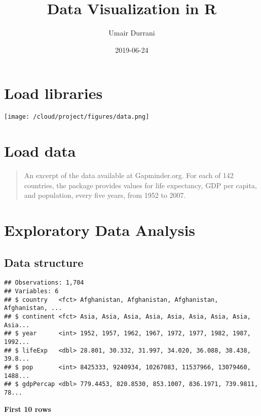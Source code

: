 \documentclass[]{article}
\title{Data Visualization in R}
\author{Umair Durrani}
\date{2019-06-24}
\begin{document}
\maketitle

{
\setcounter{tocdepth}{2}
\tableofcontents
}
\hypertarget{load-libraries}{%
\section{Load libraries}\label{load-libraries}}

\texttt{[image: /cloud/project/figures/data.png]}

\hypertarget{load-data}{%
\section{Load data}\label{load-data}}

\begin{quote}
An excerpt of the data available at Gapminder.org. For each of 142
countries, the package provides values for life expectancy, GDP per
capita, and population, every five years, from 1952 to 2007.
\end{quote}

\hypertarget{exploratory-data-analysis}{%
\section{Exploratory Data Analysis}\label{exploratory-data-analysis}}

\hypertarget{data-structure}{%
\subsection{Data structure}\label{data-structure}}

\begin{verbatim}
## Observations: 1,704
## Variables: 6
## $ country   <fct> Afghanistan, Afghanistan, Afghanistan, Afghanistan, ...
## $ continent <fct> Asia, Asia, Asia, Asia, Asia, Asia, Asia, Asia, Asia...
## $ year      <int> 1952, 1957, 1962, 1967, 1972, 1977, 1982, 1987, 1992...
## $ lifeExp   <dbl> 28.801, 30.332, 31.997, 34.020, 36.088, 38.438, 39.8...
## $ pop       <int> 8425333, 9240934, 10267083, 11537966, 13079460, 1488...
## $ gdpPercap <dbl> 779.4453, 820.8530, 853.1007, 836.1971, 739.9811, 78...
\end{verbatim}

\textbf{First 10 rows}
\end{document}
